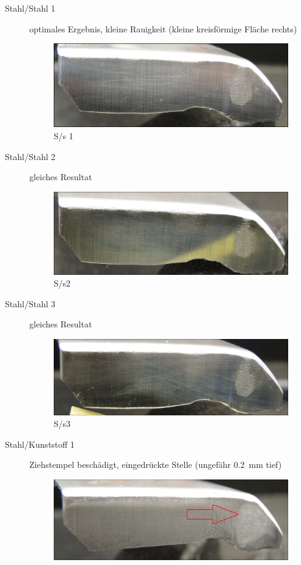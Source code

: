 \documentclass[12pt,a4paper,parskip]{scrartcl}
\begin{document}
\begin{description}
\item[Stahl/Stahl 1] optimales Ergebnis, kleine Rauigkeit (kleine kreisförmige Fläche rechts)
\begin{figure}[H]
\centering
\includegraphics[width=.8\textwidth]{Ss1a}
\caption{S/s 1}
\label{fig:ss1a}
\end{figure}

\item[Stahl/Stahl 2]gleiches Resultat
\begin{figure}[H]
\centering
\includegraphics[width=.8\textwidth]{Ss2}
\caption{S/s2}
\label{fig:ss2}
\end{figure}
\item[Stahl/Stahl 3] gleiches Resultat
\begin{figure}[H]
\centering
\includegraphics[width=.8\textwidth]{Ss3}
\caption{S/s3}
\label{fig:ss3}
\end{figure}
\item[Stahl/Kunststoff 1] Ziehstempel beschädigt, eingedrückte Stelle (ungefähr \SI{0.2}{\milli\meter} tief)
\begin{figure}[H]
\centering
\includegraphics[width=.8\textwidth]{Sk1}

\end{figure}
\end{description}
\end{document}
